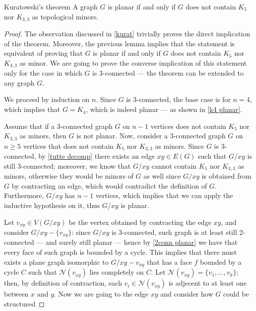 \documentclass[a4paper, 12pt]{report}
\begin{document}
    \begin{framedthm}[label={kuratowski}]{Kuratowski's theorem}
        A graph $G$ is planar if and only if $G$ does not contain $K_5$ nor $K_{3,3}$ as topological minors.
    \end{framedthm}
    
    \begin{proof}
        The observation discussed in \cref{kurat} trivially proves the direct implication of the theorem. Moreover, the previous lemma implies that the statement is equivalent of proving that $G$ is planar if and only if $G$ does not contain $K_5$ nor $K_{3,3}$ as minor. We are going to prove the converse implication of this statement only for the case in which $G$ is 3-connected --- the theorem can be extended to any graph $G$.

        We proceed by induction on $n$. Since $G$ is 3-connected, the base case is for $n = 4$, which implies that $G = K_4$, which is indeed planar --- as shown in \cref{k4 planar}.

        Assume that if a 3-connected graph $G$ on $n - 1$ vertices does not contain $K_5$ nor $K_{3,3}$ as minors, then $G$ is not planar. Now, consider a 3-connected graph $G$ on $n \ge 5$ vertices that does not contain $K_5$ nor $K_{3,3}$ as minors. Since $G$ is 3-connected, by \cref{tutte decomp} there exists an edge $xy \in E(G)$ such that $G/xy$ is still 3-connected; moreover, we know that $G/xy$ cannot contain $K_5$ nor $K_{3,3}$ as minors, otherwise they would be minors of $G$ as well since $G/xy$ is obtained from $G$ by contracting an edge, which would contradict the definition of $G$. Furthermore, $G/xy$ has $n - 1$ vertices, which implies that we can apply the inductive hypothesis on it, thus $G/xy$ is planar.

        Let $v_{xy} \in V(G/xy)$ be the vertex obtained by contracting the edge $xy$, and consider $G/xy - \{v_{xy}\}$: since $G/xy$ is 3-connected, such graph is at least still 2-connected --- and surely still planar --- hence by \cref{2conn planar} we have that every face of such graph is bounded by a cycle. This implies that there must exists a plane graph isomorphic to $G/xy - v_{xy}$ that has a face $f$ bounded by a cycle $C$ such that $\mathcal N(v_{xy})$ lies completely on $C$. Let $\mathcal N (v_{xy}) = \{v_1, \ldots, v_k\}$; then, by definition of contraction, each $v_i \in \mathcal N(v_{xy})$ is adjecent to at least one between $x$ and $y$. Now we are going to  the edge $xy$ and consider how $G$ could be structured


\end{proof}
\end{document}
